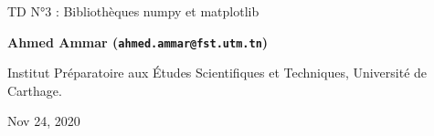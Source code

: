 \documentclass[%
oneside,                 %
final,                   %
10pt,french]{article}
\begin{document}

\newcommand{\exercisesection}[1]{\subsection*{#1}}






\thispagestyle{empty}

\begin{center}
{\LARGE\bf
\begin{spacing}{1.25}
TD N°3 : Bibliothèques numpy et matplotlib
\end{spacing}
}
\end{center}


\begin{center}
{\bf Ahmed Ammar (\texttt{ahmed.ammar@fst.utm.tn})}
\end{center}

    \begin{center}
\centerline{{\small Institut Préparatoire aux Études Scientifiques et Techniques, Université de Carthage.}}
\end{center}
    

\begin{center}
Nov 24, 2020
\end{center}

\vspace{1cm}


\tableofcontents


\vspace{1cm} %




\end{document}
